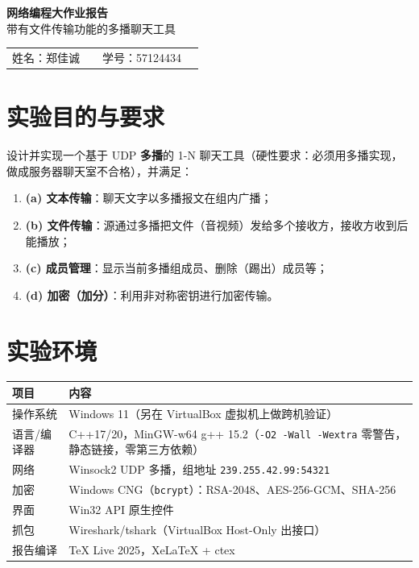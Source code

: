 \documentclass[11pt,a4paper,fontset=fandol]{ctexart}
\begin{document}
\begin{center}
{\LARGE\bfseries 网络编程大作业报告}\\[6pt]
{\large 带有文件传输功能的多播聊天工具}
\end{center}

\vspace{-0.3cm}
\begin{center}
\begin{tabular}{ll@{\hspace{2.2cm}}ll}
姓名：郑佳诚 & & 学号：57124434 & \\
\end{tabular}
\end{center}

\section{实验目的与要求}

设计并实现一个基于 UDP \textbf{多播}的 1-N 聊天工具（硬性要求：必须用多播实现，
做成服务器聊天室不合格），并满足：

\begin{enumerate}[itemsep=1pt,topsep=2pt]
  \item \textbf{(a) 文本传输}：聊天文字以多播报文在组内广播；
  \item \textbf{(b) 文件传输}：源通过多播把文件（音视频）发给多个接收方，接收方收到后能播放；
  \item \textbf{(c) 成员管理}：显示当前多播组成员、删除（踢出）成员等；
  \item \textbf{(d) 加密（加分）}：利用非对称密钥进行加密传输。
\end{enumerate}

\section{实验环境}

\begin{table}[H]
\centering\small
\begin{tabularx}{0.95\textwidth}{lX}
\toprule
项目 & 内容 \\
\midrule
操作系统 & Windows 11（另在 VirtualBox 虚拟机上做跨机验证） \\
语言/编译器 & C++17/20，MinGW-w64 g++ 15.2（\texttt{-O2 -Wall -Wextra} 零警告，静态链接，零第三方依赖） \\
网络 & Winsock2 UDP 多播，组地址 \texttt{239.255.42.99:54321} \\
加密 & Windows CNG（\texttt{bcrypt}）：RSA-2048、AES-256-GCM、SHA-256 \\
界面 & Win32 API 原生控件 \\
抓包 & Wireshark/tshark（VirtualBox Host-Only 出接口） \\
报告编译 & TeX Live 2025，XeLaTeX + ctex \\
\bottomrule
\end{tabularx}
\end{table}
\end{document}
